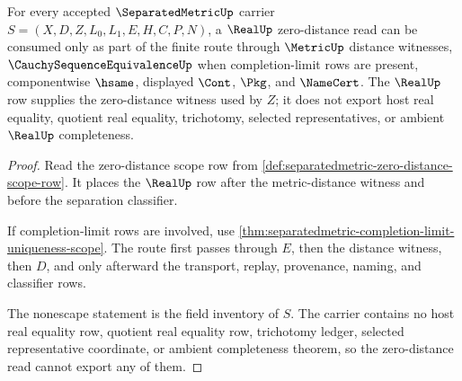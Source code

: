 \begin{theorem}
\label{thm:separatedmetric-real-zero-distance-nonescape}
For every accepted $\SeparatedMetricUp$ carrier $S=(X,D,Z,L_0,L_1,E,H,C,P,N)$, a $\RealUp$ zero-distance read can be consumed only as part of the finite route through $\MetricUp$ distance witnesses, $\CauchySequenceEquivalenceUp$ when completion-limit rows are present, componentwise $\hsame$, displayed $\Cont$, $\Pkg$, and $\NameCert$. The $\RealUp$ row supplies the zero-distance witness used by $Z$; it does not export host real equality, quotient real equality, trichotomy, selected representatives, or ambient $\RealUp$ completeness.
\end{theorem}
\begin{proof}
Read the zero-distance scope row from \autoref{def:separatedmetric-zero-distance-scope-row}. It places the $\RealUp$ row after the metric-distance witness and before the separation classifier.

If completion-limit rows are involved, use \autoref{thm:separatedmetric-completion-limit-uniqueness-scope}. The route first passes through $E$, then the distance witness, then $D$, and only afterward the transport, replay, provenance, naming, and classifier rows.

The nonescape statement is the field inventory of $S$. The carrier contains no host real equality row, quotient real equality row, trichotomy ledger, selected representative coordinate, or ambient completeness theorem, so the zero-distance read cannot export any of them.
\end{proof}

